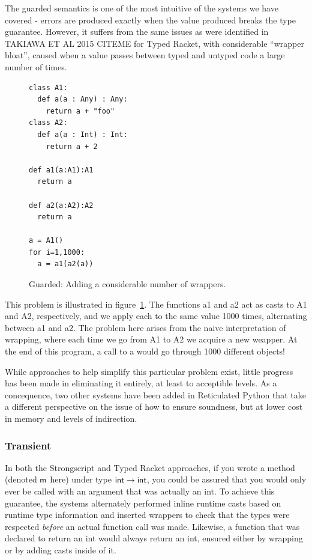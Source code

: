 \documentclass[preprint]{sigplanconf}
\newcommand{\m}{\M{\xt{m}}}
\newcommand{\M}[1]{\ensuremath{#1}\xspace}
\newcommand{\xt}[1]{{\sf{#1}}\xspace}
\begin{document}
The guarded semantics is one of the most intuitive of the systems we have covered - errors are 
produced exactly when the value produced breaks the type guarantee. However, it suffers from the
same issues as were identified in TAKIAWA ET AL 2015 CITEME for Typed Racket, with considerable
``wrapper bloat'', caused when a value passes between typed and untyped code a large number of times.

\begin{figure}[h]
\begin{verbatim}
class A1:
  def a(a : Any) : Any:
    return a + "foo"
class A2:
  def a(a : Int) : Int:
    return a + 2

def a1(a:A1):A1
  return a

def a2(a:A2):A2
  return a

a = A1()
for i=1,1000:
  a = a1(a2(a))
\end{verbatim}
\caption{Guarded: Adding a considerable number of wrappers.}
\label{fig:guard3}
\end{figure}

This problem is illustrated in figure~\ref{fig:guard3}. The functions a1 and a2 act as casts to A1 and A2,
respectively, and we apply each to the same value 1000 times, alternating between a1 and a2. The problem 
here arises from the naive interpretation of wrapping, where each time we go from A1 to A2 we acquire a new
weapper. At the end of this program, a call to a would go through 1000 different objects!

While approaches to help simplify this particular problem exist, little progress has been made in eliminating
it entirely, at least to acceptible levels. As a concequence, two other systems have been added in Reticulated
Python that take a different perspective on the issue of how to ensure soundness, but at lower cost in memory
and levels of indirection.

\subsubsection{Transient}

In both the Strongscript and Typed Racket approaches, if you wrote a method (denoted $\m$ here)
under type $\xt{int} \rightarrow \xt{int}$, you could be assured that you would only ever be called
with an argument that was actually an int. To achieve this guarantee, the systems alternately
performed inline runtime casts based on runtime type information and inserted wrappers to
check that the types were respected \emph{before} an actual function call was made. Likewise,
a function that was declared to return an int would always return an int, ensured either by
wrapping or by adding casts inside of it.
\end{document}
